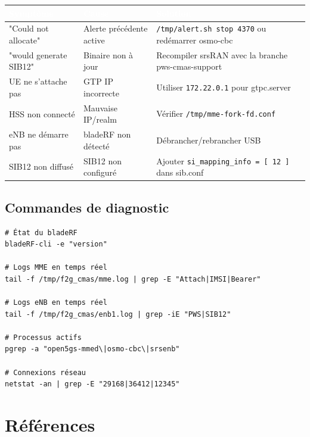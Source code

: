\documentclass[11pt,a4paper]{article}
\newcommand{\ip}[1]{\texttt{\color{pkfblue}#1}}
\newcommand{\cmd}[1]{\texttt{\color{pkfgray}#1}}
\newcommand{\file}[1]{\texttt{\color{successgreen}#1}}
\begin{document}
\begin{center}
\begin{tabularx}{\textwidth}{|l|l|X|}
\hline
\rowcolor{pkfblue}
\textcolor{white}{\textbf{Symptôme}} & \textcolor{white}{\textbf{Cause}} & \textcolor{white}{\textbf{Solution}} \\
\hline
"Could not allocate" & Alerte précédente active & \cmd{/tmp/alert.sh stop 4370} ou redémarrer osmo-cbc \\
\hline
"would generate SIB12" & Binaire non à jour & Recompiler srsRAN avec la branche pws-cmas-support \\
\hline
UE ne s'attache pas & GTP IP incorrecte & Utiliser \ip{172.22.0.1} pour gtpc.server \\
\hline
HSS non connecté & Mauvaise IP/realm & Vérifier \file{/tmp/mme-fork-fd.conf} \\
\hline
eNB ne démarre pas & bladeRF non détecté & Débrancher/rebrancher USB \\
\hline
SIB12 non diffusé & SIB12 non configuré & Ajouter \texttt{si\_mapping\_info = [ 12 ]} dans sib.conf \\
\hline
\end{tabularx}
\end{center}

\subsection{Commandes de diagnostic}

\begin{cmdbox}
\begin{lstlisting}[style=bashstyle]
# État du bladeRF
bladeRF-cli -e "version"

# Logs MME en temps réel
tail -f /tmp/f2g_cmas/mme.log | grep -E "Attach|IMSI|Bearer"

# Logs eNB en temps réel
tail -f /tmp/f2g_cmas/enb1.log | grep -iE "PWS|SIB12"

# Processus actifs
pgrep -a "open5gs-mmed\|osmo-cbc\|srsenb"

# Connexions réseau
netstat -an | grep -E "29168|36412|12345"
\end{lstlisting}
\end{cmdbox}

\newpage

\section{Références}
\end{document}
